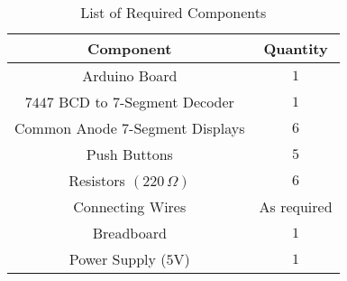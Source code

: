 \begin{table}[h]
    \centering
    \renewcommand{\arraystretch}{1.2}
    \begin{tabular}{|c|c|}
        \hline
        \textbf{Component} & \textbf{Quantity} \\
        \hline
        Arduino Board & $1$ \\
        $7447$ BCD to 7-Segment Decoder & $1$ \\
        Common Anode 7-Segment Displays & $6$ \\
        Push Buttons & $5$ \\
        Resistors $(220\,\Omega)$ & $6$ \\
        Connecting Wires & As required \\
        Breadboard & $1$ \\
        Power Supply ($5$V) & $1$ \\
        \hline
    \end{tabular}
    \caption{List of Required Components}
    \label{tab:components}
\end{table}

